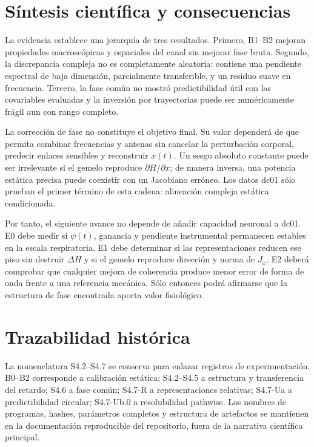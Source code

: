\section{Síntesis científica y consecuencias}
\label{sec:synthesis}

La evidencia establece una jerarquía de tres resultados. Primero, B1--B2 mejoran
propiedades macroscópicas y espaciales del canal sin mejorar fase bruta. Segundo,
la discrepancia compleja no es completamente aleatoria: contiene una pendiente
espectral de baja dimensión, parcialmente transferible, y un residuo suave en
frecuencia. Tercero, la fase común no mostró predictibilidad útil con las
covariables evaluadas y la inversión por trayectorias puede ser numéricamente
frágil aun con rango completo.

La corrección de fase no constituye el objetivo final. Su valor dependerá de que
permita combinar frecuencias y antenas sin cancelar la perturbación corporal,
predecir enlaces sensibles y reconstruir $x(t)$. Un sesgo absoluto constante puede
ser irrelevante si el gemelo reproduce $\partial H/\partial x$; de manera inversa,
una potencia estática precisa puede coexistir con un Jacobiano erróneo. Los datos
dc01 sólo prueban el primer término de esta cadena: alineación compleja estática
condicionada.

Por tanto, el siguiente avance no depende de añadir capacidad neuronal a dc01.
E0 debe medir si $\psi(t)$, ganancia y pendiente instrumental permanecen estables
en la escala respiratoria. E1 debe determinar si las representaciones reducen ese
piso sin destruir $\Delta H$ y si el gemelo reproduce dirección y norma de $J_x$.
E2 deberá comprobar que cualquier mejora de coherencia produce menor error de forma
de onda frente a una referencia mecánica. Sólo entonces podrá afirmarse que la
estructura de fase encontrada aporta valor fisiológico.

\section{Trazabilidad histórica}
\label{sec:trazabilidad_avances}

La nomenclatura S4.2--S4.7 se conserva para enlazar registros de experimentación. B0--B2 corresponde a calibración estática; S4.2--S4.5 a estructura y transferencia del retardo; S4.6 a fase común; S4.7-R a representaciones relativas; S4.7-Ua a predictibilidad circular; S4.7-Ub.0 a resolubilidad pathwise. Los nombres de programas, hashes, parámetros completos y estructura de artefactos se mantienen en la documentación reproducible del repositorio, fuera de la narrativa científica principal.
